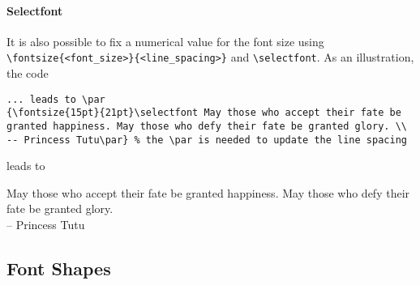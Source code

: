\paragraph{Selectfont} It is also possible to fix a numerical value for the font size using \texttt{\textbackslash fontsize\{<font\_size>\}\{<line\_spacing>\}} and \texttt{\textbackslash selectfont}. As an illustration, the code
\begin{lstlisting}
... leads to \par
{\fontsize{15pt}{21pt}\selectfont May those who accept their fate be granted happiness. May those who defy their fate be granted glory. \\
-- Princess Tutu\par} % the \par is needed to update the line spacing
\end{lstlisting}
leads to \par
{\fontsize{15pt}{21pt}\selectfont May those who accept their fate be granted happiness. May those who defy their fate be granted glory. \\
-- Princess Tutu\par}

\subsection{Font Shapes}

